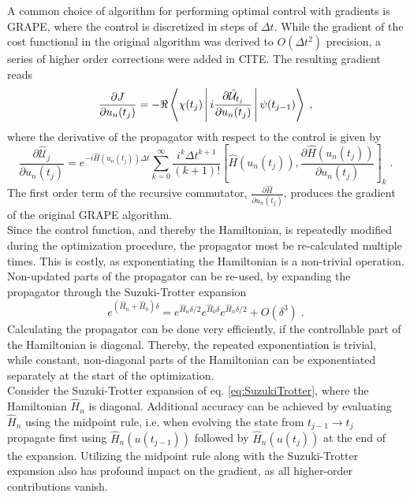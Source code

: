 \documentclass[%
 reprint,
 amsmath,amssymb,
 aps,
pra,
]{revtex4-1}
\begin{document}
A common choice of algorithm for performing optimal control with gradients is GRAPE, where the control is discretized in steps of $\Delta t$. While the gradient of the cost functional in the original algorithm was derived to $O(\Delta t ^2)$ precision, a series of higher order corrections were added in CITE. The resulting gradient reads
\begin{equation}
	\frac{\partial J}{\partial u_n (t_j)}  = - \Re \Braket{\chi (t_j) | i  \frac{\partial \hat{\mathcal{U}}_{t_j}}{\partial u_n (t_j)} | \psi (t_{j-1})} \; ,
\end{equation} 
where the derivative of the propagator with respect to the control is given by
\begin{equation}
	\frac{\partial \hat{\mathcal{U}}_{j}}{\partial u_n (t_j)} = e^{-i \hat{H} (u_n (t_j)) \Delta t}  \sum_{k = 0}^{\infty }  \frac{i^{k} \Delta t^{k+1}}{(k+1)!} \left[ \hat{H} (u_n (t_j)) , \frac{\partial \hat{H} (u_n (t_j))}{\partial u_n (t_j)}  \right]_k \; . 
\end{equation}
The first order term of the recursive commutator, $\frac{\partial \hat{H}}{\partial u_n (t_j)}$, produces the gradient of the original GRAPE algorithm.\\
Since the control function, and thereby the Hamiltonian, is repeatedly modified during the optimization procedure, the propagator most be re-calculated multiple times. This is costly, as exponentiating the Hamiltonian is a non-trivial operation. Non-updated parts of the propagator can be re-used, by expanding the propagator through the Suzuki-Trotter expansion 
\begin{equation}
		e ^{( \hat{H}_n + \hat{H}_0  ) \delta } = e^{  \hat{H}_n \delta /2  } e^{ \hat{H}_0 \delta } e^{ \hat{H}_n \delta /2 } + O(\delta^3) \; . \label{eq:SuzukiTrotter}
\end{equation}
Calculating the propagator can be done very efficiently, if the controllable part of the Hamiltonian is diagonal. Thereby, the repeated exponentiation is trivial, while constant, non-diagonal parts of the Hamiltonian can be exponentiated separately at the start of the optimization.\\
Consider the Suzuki-Trotter expansion of eq. \eqref{eq:SuzukiTrotter}, where the Hamiltonian $\hat{H}_n$ is diagonal. Additional accuracy can be achieved by evaluating $\hat{H}_n$ using the midpoint rule, i.e. when evolving the state from $t_{j-1} \to t_j$ propagate first using $\hat{H}_n (u (t_{j-1}))$ followed by $\hat{H}_n (u (t_{j}))$ at the end of the expansion. Utilizing the midpoint rule along with the Suzuki-Trotter expansion also has profound impact on the  gradient, as all higher-order contributions vanish.
\end{document}
